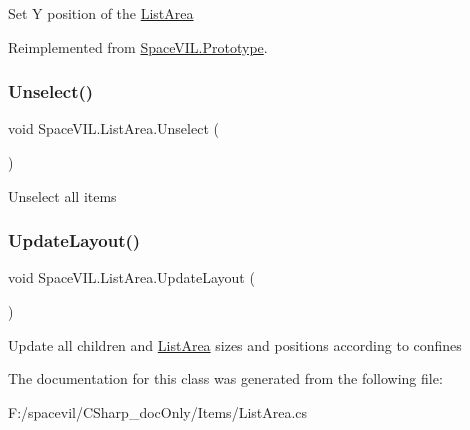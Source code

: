Set Y position of the \mbox{\hyperlink{class_space_v_i_l_1_1_list_area}{List\+Area}} 



Reimplemented from \mbox{\hyperlink{class_space_v_i_l_1_1_prototype}{Space\+V\+I\+L.\+Prototype}}.

\mbox{\label{class_space_v_i_l_1_1_list_area_ac7ed057dd6d34a265aaacca971c61b2b}} 
\subsubsection{\texorpdfstring{Unselect()}{Unselect()}}
{\footnotesize\ttfamily void Space\+V\+I\+L.\+List\+Area.\+Unselect (\begin{DoxyParamCaption}{ }\end{DoxyParamCaption})}



Unselect all items 

\mbox{\label{class_space_v_i_l_1_1_list_area_af0fb95222910f6e85274a38dfa506174}} 
\subsubsection{\texorpdfstring{Update\+Layout()}{UpdateLayout()}}
{\footnotesize\ttfamily void Space\+V\+I\+L.\+List\+Area.\+Update\+Layout (\begin{DoxyParamCaption}{ }\end{DoxyParamCaption})}



Update all children and \mbox{\hyperlink{class_space_v_i_l_1_1_list_area}{List\+Area}} sizes and positions according to confines 



The documentation for this class was generated from the following file\+:\begin{DoxyCompactItemize}
\item 
F\+:/spacevil/\+C\+Sharp\+\_\+doc\+Only/\+Items/List\+Area.\+cs\end{DoxyCompactItemize}
